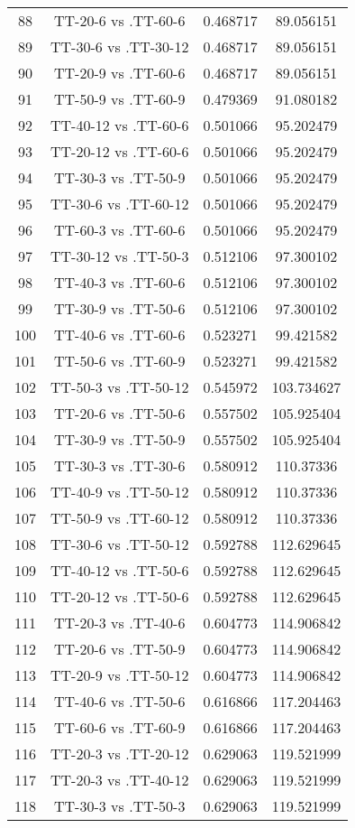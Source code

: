 \documentclass[a4paper,10pt]{article}
\begin{document}
\begin{landscape}
\begin{table}[!htp]
\begin{tabular}{cccc}
88&TT-20-6 vs .TT-60-6&0.468717&89.056151\\
89&TT-30-6 vs .TT-30-12&0.468717&89.056151\\
90&TT-20-9 vs .TT-60-6&0.468717&89.056151\\
91&TT-50-9 vs .TT-60-9&0.479369&91.080182\\
92&TT-40-12 vs .TT-60-6&0.501066&95.202479\\
93&TT-20-12 vs .TT-60-6&0.501066&95.202479\\
94&TT-30-3 vs .TT-50-9&0.501066&95.202479\\
95&TT-30-6 vs .TT-60-12&0.501066&95.202479\\
96&TT-60-3 vs .TT-60-6&0.501066&95.202479\\
97&TT-30-12 vs .TT-50-3&0.512106&97.300102\\
98&TT-40-3 vs .TT-60-6&0.512106&97.300102\\
99&TT-30-9 vs .TT-50-6&0.512106&97.300102\\
100&TT-40-6 vs .TT-60-6&0.523271&99.421582\\
101&TT-50-6 vs .TT-60-9&0.523271&99.421582\\
102&TT-50-3 vs .TT-50-12&0.545972&103.734627\\
103&TT-20-6 vs .TT-50-6&0.557502&105.925404\\
104&TT-30-9 vs .TT-50-9&0.557502&105.925404\\
105&TT-30-3 vs .TT-30-6&0.580912&110.37336\\
106&TT-40-9 vs .TT-50-12&0.580912&110.37336\\
107&TT-50-9 vs .TT-60-12&0.580912&110.37336\\
108&TT-30-6 vs .TT-50-12&0.592788&112.629645\\
109&TT-40-12 vs .TT-50-6&0.592788&112.629645\\
110&TT-20-12 vs .TT-50-6&0.592788&112.629645\\
111&TT-20-3 vs .TT-40-6&0.604773&114.906842\\
112&TT-20-6 vs .TT-50-9&0.604773&114.906842\\
113&TT-20-9 vs .TT-50-12&0.604773&114.906842\\
114&TT-40-6 vs .TT-50-6&0.616866&117.204463\\
115&TT-60-6 vs .TT-60-9&0.616866&117.204463\\
116&TT-20-3 vs .TT-20-12&0.629063&119.521999\\
117&TT-20-3 vs .TT-40-12&0.629063&119.521999\\
118&TT-30-3 vs .TT-50-3&0.629063&119.521999\\

\end{tabular}
\end{table}
\end{landscape}
\end{document}

